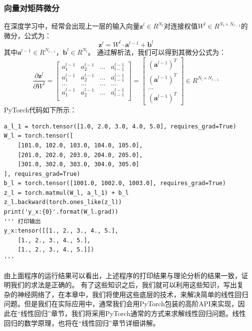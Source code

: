 \documentclass[UTF8]{article}
\begin{document}
\subsubsection{向量对矩阵微分}
在深度学习中，经常会出现上一层的输入向量$\boldsymbol{z}^{l} \in R^{N_{l}}$对连接权值$W^{l} \in R^{N_{l} \times N_{l-1}}$的微分，公式为：
\begin{equation}
\boldsymbol{z}^{l}=W^{l} \cdot \boldsymbol{a}^{l-1} + \boldsymbol{b}^{l}
\label{autodif-neural-network-layer-formula}
\end{equation}
其中$\boldsymbol{a}^{l-1} \in R^{N_{l-1}}$，$\boldsymbol{b}^{l} \in R^{N_{l}}$。\newline
通过解析法，我们可以得到其微分公式为：
\begin{equation}
\frac{ \partial{ \boldsymbol{z}^{l} } }{ \partial{W^{l}} } = \begin{bmatrix}
a_{1}^{l-1} & a_{2}^{l-1} & ... & a_{l-1}^{l-1} \\
a_{1}^{l-1} & a_{2}^{l-1} & ... & a_{l-1}^{l-1} \\
... & ... & ... & ... \\
a_{1}^{l-1} & a_{2}^{l-1} & ... & a_{l-1}^{l-1} \\
\end{bmatrix} = \begin{bmatrix}
(\boldsymbol{a}^{l-1})^{T} \\
(\boldsymbol{a}^{l-1})^{T} \\
... \\
(\boldsymbol{a}^{l-1})^{T}
\end{bmatrix} \in R^{ N_{l} \times N_{l-1} }
\label{autodif-neural-network-layer-W-gradient}
\end{equation}
PyTorch代码如下所示：
\begin{lstlisting}
a_l_1 = torch.tensor([1.0, 2.0, 3.0, 4.0, 5.0], requires_grad=True)
W_l = torch.tensor([
    [101.0, 102.0, 103.0, 104.0, 105.0],
    [201.0, 202.0, 203.0, 204.0, 205.0],
    [301.0, 302.0, 303.0, 304.0, 305.0]
], requires_grad=True)
b_l = torch.tensor([1001.0, 1002.0, 1003.0], requires_grad=True)
z_l = torch.matmul(W_l, a_l_1) + b_l
z_l.backward(torch.ones_like(z_l))
print('y_x:{0}'.format(W_l.grad))
''' 打印输出
y_x:tensor([[1., 2., 3., 4., 5.],
    [1., 2., 3., 4., 5.],
    [1., 2., 3., 4., 5.]])
'''
\end{lstlisting}
由上面程序的运行结果可以看出，上述程序的打印结果与理论分析的结果一致，证明我们的求法是正确的。\newline
有了这些知识之后，我们就可以利用这些知识，写出复杂的神经网络了，在本章中，我们将使用这些底层的技术，来解决简单的线性回归问题。但是我们在实际应用中，通常我们会用PyTorch包装的高阶API来实现，因此在“线性回归”章节，我们将采用PyTorch通常的方式来求解线性回归问题。线性回归的数学原理，也将在“线性回归”章节详细讲解。
\end{document}
